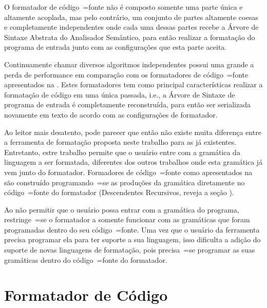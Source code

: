 O formatador de código~=fonte não é composto somente uma parte única e
altamente acoplada, mas pelo contrário,
um conjunto de partes altamente coesas e
completamente independentes onde cada uma dessas partes recebe a Árvore de Sintaxe Abstrata do Analisador Semântico,
para então realizar a formatação do programa de entrada junto com as configurações que esta parte aceita.

Continuamente chamar diversos algoritmos independentes possui uma grande a perda de performance em comparação com os formatadores de código~=fonte apresentados na .
Estes formatadores tem como principal características realizar a formatação de código em uma única passada,
i.e.,
a Árvore de Sintaxe de programa de entrada é completamente reconstruída,
para então ser serializada novamente em texto de acordo com as configurações de formatador.

Ao leitor mais desatento,
pode parecer que então não existe muita diferença entre a ferramenta de formatação proposta neste trabalho para as já existentes.
Entretanto,
estre trabalho permite que o usuário entre com a gramática da linguagem a ser formatada,
diferentes dos outros trabalhos onde esta gramática já vem junto do formatador.
Formadores de código~=fonte como apresentados na  são construído programando~=se as produções da gramática diretamente no código~=fonte do formatador (Descendentes Recursivos,
reveja a seção ).

Ao não permitir que o usuário possa entrar com a gramática do programa,
restringe~=se o formatador a somente funcionar com as gramáticas que foram programadas dentro do seu código~=fonte.
Uma vez que o usuário da ferramenta precisa programar ela para ter suporte a sua linguagem,
isso dificulta a adição do suporte de novas linguagens de formatação,
pois precisa~=se programar as suas gramáticas dentro do código~=fonte do formatador.


\section{Formatador de Código}


